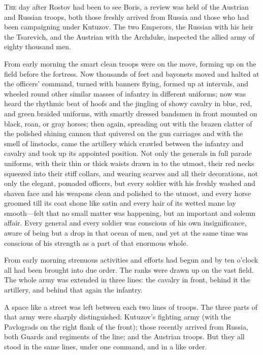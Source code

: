 \lettrine[lines=2, loversize=0.3, lraise=0]{\initfamily T}{he}
day after Rostov had been to see Boris, a review was held of
the Austrian and Russian troops, both those freshly arrived from
Russia and those who had been campaigning under Kutuzov. The two
Emperors, the Russian with his heir the Tsarevich, and the
Austrian with the Archduke, inspected the allied army of eighty
thousand men.

From early morning the smart clean troops were on the move,
forming up on the field before the fortress. Now thousands of
feet and bayonets moved and halted at the officers' command,
turned with banners flying, formed up at intervals, and wheeled
round other similar masses of infantry in different uniforms; now
was heard the rhythmic beat of hoofs and the jingling of showy
cavalry in blue, red, and green braided uniforms, with smartly
dressed bandsmen in front mounted on black, roan, or gray horses;
then again, spreading out with the brazen clatter of the polished
shining cannon that quivered on the gun carriages and with the
smell of linstocks, came the artillery which crawled between the
infantry and cavalry and took up its appointed position. Not only
the generals in full parade uniforms, with their thin or thick
waists drawn in to the utmost, their red necks squeezed into
their stiff collars, and wearing scarves and all their
decorations, not only the elegant, pomaded officers, but every
soldier with his freshly washed and shaven face and his weapons
clean and polished to the utmost, and every horse groomed till
its coat shone like satin and every hair of its wetted mane lay
smooth---felt that no small matter was happening, but an
important and solemn affair. Every general and every soldier was
conscious of his own insignificance, aware of being but a drop in
that ocean of men, and yet at the same time was conscious of his
strength as a part of that enormous whole.

From early morning strenuous activities and efforts had begun and
by ten o'clock all had been brought into due order. The ranks
were drawn up on the vast field. The whole army was extended in
three lines: the cavalry in front, behind it the artillery, and
behind that again the infantry.

A space like a street was left between each two lines of
troops. The three parts of that army were sharply distinguished:
Kutuzov's fighting army (with the Pavlograds on the right flank
of the front); those recently arrived from Russia, both Guards
and regiments of the line; and the Austrian troops. But they all
stood in the same lines, under one command, and in a like order.

